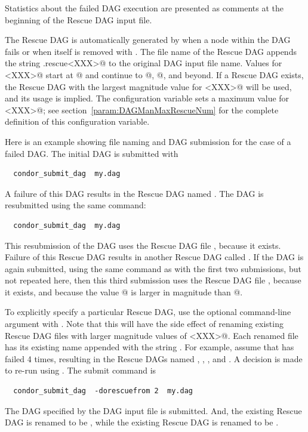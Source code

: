 Statistics about the failed DAG execution are presented as
comments at the beginning of the Rescue DAG input file.

The Rescue DAG is automatically generated by  when a node
within the DAG fails or when  itself is removed
with .
The file name of the Rescue DAG
appends the string
\verb@.rescue<XXX>@ to the original DAG input file name.
Values for \verb@<XXX>@ start at @ and continue
to @, @, and beyond.
If a Rescue DAG exists,
the Rescue DAG with the largest magnitude value for \verb@<XXX>@
will be used, and its usage is implied.
The configuration variable 
sets a maximum value for \verb@<XXX>@;
see section~\ref{param:DAGManMaxRescueNum} for the complete definition
of this configuration variable.


Here is an example showing file naming and DAG submission
for the case of a failed DAG.
The initial DAG is submitted with
\begin{verbatim}
  condor_submit_dag  my.dag
\end{verbatim}
A failure of this DAG results in the Rescue DAG
named .
The DAG is resubmitted using the same command: 
\begin{verbatim}
  condor_submit_dag  my.dag
\end{verbatim}
This resubmission of the DAG uses the Rescue DAG file ,
because it exists.
Failure of this Rescue DAG results in another Rescue DAG
called .
If the DAG is again submitted, using the same command
as with the first two submissions, but not repeated here,
then this third submission uses the Rescue DAG file ,
because it exists, and because the value @ is larger
in magnitude than @.

To explicitly specify a particular Rescue DAG,
use the optional command-line argument 
with .
Note that this will have the side effect of renaming 
existing Rescue DAG files with larger magnitude values 
of \verb@<XXX>@.
Each renamed file has its existing name appended with
the string .
For example, assume that  has failed 4 times,
resulting in the Rescue DAGs named
,
,
,
and
.
A decision is made to re-run using .
The submit command is
\begin{verbatim}
  condor_submit_dag  -dorescuefrom 2  my.dag
\end{verbatim}
The DAG specified by the DAG input file 
is submitted.
And, the existing Rescue DAG  is
renamed to be ,
while the existing Rescue DAG  is
renamed to be .



